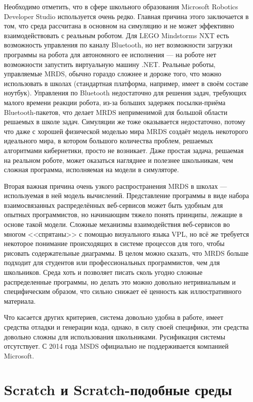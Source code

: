 \documentclass[a5paper]{article}
\begin{document}
Необходимо отметить, что в сфере школьного образования Microsoft Robotics Developer Studio используется очень редко. 
Главная причина этого заключается в том, что среда рассчитана в основном на симуляцию и не может эффективно 
взаимодействовать с реальным роботом. Для LEGO Mindstorms NXT есть возможность управления по каналу Bluetooth, 
но нет возможности загрузки программы на робота для автономного ее исполнения --- на роботе нет возможности 
запустить виртуальную машину .NET. Реальные роботы, управляемые MRDS, обычно гораздо сложнее и дороже того, 
что можно использовать в школах (стандартная платформа, например, имеет в своём составе ноутбук). Управления 
по Bluetooth недостаточно для решения задач, требующих малого времени реакции робота, из-за больших задержек 
посылки-приёма Bluetooth-пакетов, что делает MRDS неприменимой для большой области решаемых в школе задач. Симуляции 
же тоже оказывается недостаточно, потому что даже с хорошей физической моделью мира MRDS создаёт модель некоторого 
идеального мира, в котором большого количества проблем, решаемых алгоритмами кибернетики, просто не возникает. 
Даже простая задача, решаемая на реальном роботе, может оказаться нагляднее и полезнее школьникам, чем сложная 
программа, исполняемая на модели в симуляторе.

Вторая важная причина очень узкого распространения MRDS в школах --- используемая в ней модель вычислений. 
Представление программы в виде набора взаимосвязанных распределённых веб-сервисов может быть удобным для 
опытных программистов, но начинающим тяжело понять принципы, лежащие в основе такой модели. Сложные механизмы 
взаимодействия веб-сервисов во многом <<спрятаны>> с помощью визуального языка VPL, но всё же требуется некоторое 
понимание происходящих в системе процессов для того, чтобы рисовать содержательные диаграммы. В целом можно сказать, 
что MRDS больше подходит для студентов или профессиональных программистов, чем для школьников. Среда хоть и 
позволяет писать сколь угодно сложные распределенные программы, но делать это можно довольно нетривиальным и 
специфическим образом, что сильно снижает её ценность как иллюстративного материала.

Что касается других критериев, система довольно удобна в работе, имеет средства отладки и генерации кода, однако, 
в силу своей специфики, эти средства довольно сложны для использования школьниками. Русификация системы отсутствует. 
С 2014 года MSDS официально не поддерживается компанией Microsoft.

\section{Scratch и Scratch-подобные среды}
\end{document}

